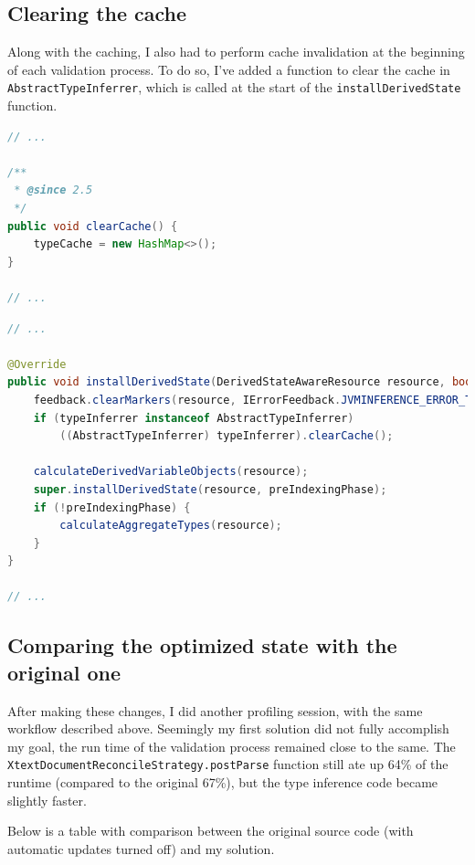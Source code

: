 \documentclass[11pt,a4paper,oneside]{report}
\begin{document}
\subsection{Clearing the cache}
Along with the caching, I also had to perform cache invalidation at the
beginning of each validation process. To do so, I've added a function to clear
the cache in \texttt{AbstractTypeInferrer}, which is called at the start of the
\texttt{installDerivedState} function.

\begin{lstlisting}[language=java]
// ...

/**
 * @since 2.5
 */
public void clearCache() {
    typeCache = new HashMap<>();
}

// ...
\end{lstlisting}

\begin{lstlisting}[language=java]
// ...

@Override
public void installDerivedState(DerivedStateAwareResource resource, boolean preIndexingPhase) {
    feedback.clearMarkers(resource, IErrorFeedback.JVMINFERENCE_ERROR_TYPE);
    if (typeInferrer instanceof AbstractTypeInferrer)
        ((AbstractTypeInferrer) typeInferrer).clearCache();

    calculateDerivedVariableObjects(resource);
    super.installDerivedState(resource, preIndexingPhase);
    if (!preIndexingPhase) {
        calculateAggregateTypes(resource);
    }
}

// ...
\end{lstlisting}

\subsection{Comparing the optimized state with the original one}
After making these changes, I did another profiling session, with the same
workflow described above. Seemingly my first solution did not fully accomplish
my goal, the run time of the validation process remained close to the same. The
\texttt{XtextDocumentReconcileStrategy.postParse} function still ate up 64\% of
the runtime (compared to the original 67\%), but the type inference code became
slightly faster.

Below is a table with comparison between the original source code (with
automatic updates turned off) and my solution.
\end{document}
